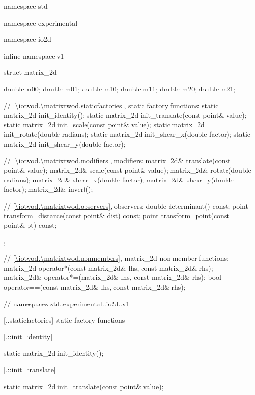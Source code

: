 \begin{codeblock}
namespace std { namespace experimental { namespace io2d { inline namespace v1 {
  struct matrix_2d {
    double m00;
    double m01;
    double m10;
    double m11;
    double m20;
    double m21;
    
    // \ref{\iotwod.\matrixtwod.staticfactories}, static factory functions:
    static matrix_2d init_identity();
    static matrix_2d init_translate(const point& value);
    static matrix_2d init_scale(const point& value);
    static matrix_2d init_rotate(double radians);
    static matrix_2d init_shear_x(double factor);
    static matrix_2d init_shear_y(double factor);

    // \ref{\iotwod.\matrixtwod.modifiers}, modifiers:
    matrix_2d& translate(const point& value);
    matrix_2d& scale(const point& value);
    matrix_2d& rotate(double radians);
    matrix_2d& shear_x(double factor);
    matrix_2d& shear_y(double factor);
    matrix_2d& invert();

    // \ref{\iotwod.\matrixtwod.observers}, observers:
    double determinant() const;
    point transform_distance(const point& dist) const;
    point transform_point(const point& pt) const;
  };
  
  // \ref{\iotwod.\matrixtwod.nonmembers}, matrix_2d non-member functions:
  matrix_2d operator*(const matrix_2d& lhs, const matrix_2d& rhs);
  matrix_2d& operator*=(matrix_2d& lhs, const matrix_2d& rhs);
  bool operator==(const matrix_2d& lhs, const matrix_2d& rhs);
} } } } // namespaces std::experimental::io2d::v1
\end{codeblock}

 [\iotwod.\matrixtwod.staticfactories] { static factory 
functions}

 [\iotwod.\matrixtwod::init_identity] {}
%
%
\begin{itemdecl}
static matrix_2d init_identity();
\end{itemdecl}
\begin{itemdescr}
	\pnum
	\returns
\end{itemdescr}

 [\iotwod.\matrixtwod::init_translate] {}
%
%
\begin{itemdecl}
static matrix_2d init_translate(const point& value);
\end{itemdecl}
\begin{itemdescr}
	\pnum
	\returns
\end{itemdescr}

